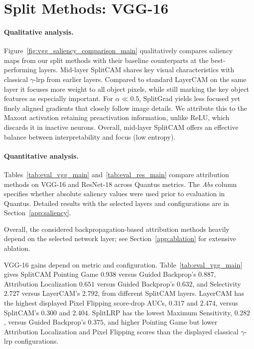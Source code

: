 \section{Split Methods: VGG-16}\label{sec:results_vgg}



\paragraph{Qualitative analysis.}
Figure~\ref{fig:vgg_saliency_comparison_main} qualitatively compares saliency maps from our split methods with their baseline counterparts at the best-performing layers. Mid-layer SplitCAM shares key visual characteristics with classical $\gamma$-\ac{lrp} from earlier layers. Compared to standard LayerCAM on the same layer it focuses more weight to all object pixels, while still marking the key object features as especially important. For $\alpha \ll 0.5$, SplitGrad yields less focused yet finely aligned gradients that closely follow image details. We attribute this to the Maxout activation retaining preactivation information, unlike ReLU, which discards it in inactive neurons. Overall, mid-layer SplitCAM offers an effective balance between interpretability and focus (low entropy).

\paragraph{Quantitative analysis.}
Tables~\ref{tab:eval_vgg_main} and~\ref{tab:eval_res_main} compare attribution methods on VGG-16 and ResNet-18 across Quantus metrics. The \emph{Abs} column specifies whether absolute saliency values were used prior to evaluation in Quantus. Detailed results with the selected layers and configurations are in Section~\ref{app:saliency}.

Overall, the considered backpropagation-based attribution methods heavily depend on the selected network layer; see Section~\ref{app:ablation} for extensive ablation.

VGG-16 gains depend on metric and configuration. Table~\ref{tab:eval_vgg_main} gives SplitCAM Pointing Game $0.938$ versus Guided Backprop's $0.887$, Attribution Localization $0.651$ versus Guided Backprop's $0.632$, and Selectivity $2.727$ versus LayerCAM's $2.792$, from different SplitCAM layers. LayerCAM has the highest displayed Pixel Flipping score-drop AUCs, $0.317$ and $2.474$, versus SplitCAM's $0.300$ and $2.404$. SplitLRP has the lowest Maximum Sensitivity, $0.282$, versus Guided Backprop's $0.375$, and higher Pointing Game but lower Attribution Localization and Pixel Flipping scores than the displayed classical $\gamma$-\ac{lrp} configurations.

